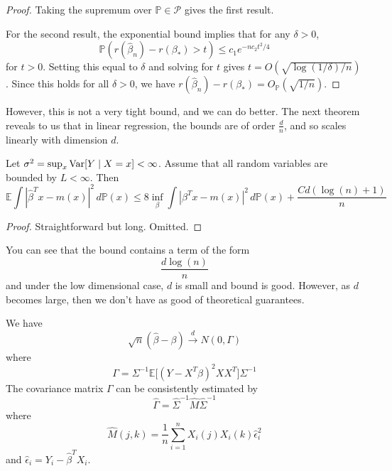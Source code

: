 \begin{proof}
    Taking the supremum over $\mathbb{P} \in \mathcal{P}$ gives the first result.

    For the second result, the exponential bound implies that for any $\delta > 0$,
    \begin{equation}
     \mathbb{P}(r(\hat{\beta}_n) - r(\beta_\ast) > t) \leq c_1 e^{-n c_2 t^2/4}
    \end{equation}
    for $t > 0$. Setting this equal to $\delta$ and solving for $t$ gives $t = O(\sqrt{\log(1/\delta)/n})$. Since this holds for all $\delta > 0$, we have $r(\hat{\beta}_n) - r(\beta_\ast) = O_{\mathbb{P}}(\sqrt{1/n})$.
  \end{proof}

  However, this is not a very tight bound, and we can do better. The next theorem reveals to us that in linear regression, the bounds are of order $\frac{d}{n}$, and so scales linearly with dimension $d$. 

  \begin{theorem} 
    Let $\sigma^2 = \sup_x \Var [Y \mid X = x] < \infty$. Assume that all random variables are bounded by $L < \infty$. Then 
    \begin{equation}
      \mathbb{E} \int |\hat{\beta}^T x - m(x) |^2 \, d\mathbb{P}(x) \leq 8 \inf_{\beta} \int |\beta^T x - m(x) |^2 \,d \mathbb{P}(x) + \frac{C d (\log(n) + 1)}{n}
    \end{equation}
  \end{theorem}
  \begin{proof}
    Straightforward but long. Omitted. 
  \end{proof}

  You can see that the bound contains a term of the form 
  \begin{equation}
    \frac{d \log(n)}{n}
  \end{equation}
  and under the low dimensional case, $d$ is small and bound is good. However, as $d$ becomes large, then we don't have as good of theoretical guarantees. 

  \begin{theorem}
    We have 
    \begin{equation}
      \sqrt{n} (\hat{\beta} - \beta) \xrightarrow{d} N(0, \Gamma) 
    \end{equation}
    where 
    \begin{equation}
      \Gamma = \Sigma^{-1} \mathbb{E} \big[ (Y - X^T \beta)^2 X X^T \big] \Sigma^{-1}
    \end{equation}
    The covariance matrix $\Gamma$ can be consistently estimated by 
    \begin{equation}
      \hat{\Gamma} = \hat{\Sigma}^{-1} \hat{M} \hat{\Sigma}^{-1}
    \end{equation}
    where 
    \begin{equation}
      \hat{M} (j, k) = \frac{1}{n} \sum_{i=1}^n X_i (j) X_i (k) \hat{\epsilon}_i^2
    \end{equation}
    and $\hat{\epsilon}_i = Y_i - \hat{\beta}^T X_i$.
  \end{theorem}

